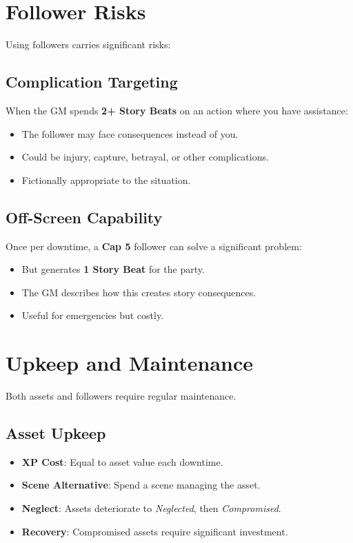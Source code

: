 \begin{multicols}{2}
\section{Follower Risks}

Using followers carries significant risks:

\subsection*{Complication Targeting}
When the GM spends \textbf{2+ Story Beats} on an action where you have assistance:
\begin{itemize}
\item The follower may face consequences instead of you.
\item Could be injury, capture, betrayal, or other complications.
\item Fictionally appropriate to the situation.
\end{itemize}

\subsection*{Off-Screen Capability}
Once per downtime, a \textbf{Cap 5} follower can solve a significant problem:
\begin{itemize}
\item But generates \textbf{1 Story Beat} for the party.
\item The GM describes how this creates story consequences.
\item Useful for emergencies but costly.
\end{itemize}

\section{Upkeep and Maintenance}

Both assets and followers require regular maintenance.

\subsection*{Asset Upkeep}
\begin{itemize}
\item \textbf{XP Cost}: Equal to asset value each downtime.
\item \textbf{Scene Alternative}: Spend a scene managing the asset.
\item \textbf{Neglect}: Assets deteriorate to \emph{Neglected}, then \emph{Compromised}.
\item \textbf{Recovery}: Compromised assets require significant investment.
\end{itemize}


\end{multicols}
